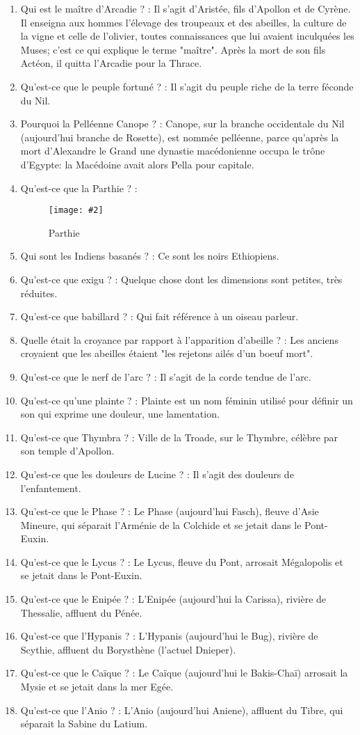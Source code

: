 \documentclass[a4paper, 11pt, hidelinks]{article}
\newcommand{\img}[4]{\begin{figure}[!ht]
    \centering
    \texttt{[image: \#2]}
    \caption{#3}
    \label{#4}
    \end{figure} }
\begin{document}
\begin{enumerate}
      \item Qui est le maître d'Arcadie ? : Il s'agit d'Aristée, fils d'Apollon et de Cyrène. Il enseigna aux hommes l'élevage des troupeaux et des abeilles, la culture de la vigne et celle de l'olivier,
            toutes connaissances que lui avaient inculquées les Muses; c'est ce qui explique le terme "maître". Après la mort de son fils Actéon, il quitta l'Arcadie pour la Thrace.
      \item Qu'est-ce que le peuple fortuné ? : Il s'agit du peuple riche de la terre féconde du Nil.
      \item Pourquoi la Pelléenne Canope ? : Canope, sur la branche occidentale du Nil (aujourd'hui branche de Rosette), est nommée pelléenne, parce qu'après la mort d'Alexandre le Grand une dynastie macédonienne 
            occupa le trône d'Egypte: la Macédoine avait alors Pella pour capitale.
      \item Qu'est-ce que la Parthie ? : 
            \img{0.1}{Parthie.png}{Parthie}{146}
      \item Qui sont les Indiens basanés ? : Ce sont les noirs Ethiopiens.
      \item Qu'est-ce que exigu ? : Quelque chose dont les dimensions sont petites, très réduites.
      \item Qu'est-ce que babillard ? : Qui fait référence à un oiseau parleur.
      \item Quelle était la croyance par rapport à l'apparition d'abeille ? : Les anciens croyaient que les abeilles étaient "les rejetons ailés d'un boeuf mort".
      \item Qu'est-ce que le nerf de l'arc ? : Il s'agit de la corde tendue de l'arc.
      \item Qu'est-ce qu'une plainte ? : Plainte est un nom féminin utilisé pour définir un son qui exprime une douleur, une lamentation.
      \item Qu'est-ce que Thymbra ? : Ville de la Troade, sur le Thymbre, célèbre par son temple d'Apollon.
      \item Qu'est-ce que les douleurs de Lucine ? : Il s'agit des douleurs de l'enfantement.
      \item Qu'est-ce que le Phase ? : Le Phase (aujourd'hui Fasch), fleuve d'Asie Mineure, qui séparait l'Arménie de la Colchide et se jetait dans le Pont-Euxin.
      \item Qu'est-ce que le Lycus ? : Le Lycus, fleuve du Pont, arrosait Mégalopolis et se jetait dans le Pont-Euxin.
      \item Qu'est-ce que le Enipée ? : L'Enipée (aujourd'hui la Carissa), rivière de Thessalie, affluent du Pénée.
      \item Qu'est-ce que l'Hypanis ? : L'Hypanis (aujourd'hui le Bug), rivière de Scythie, affluent du Borysthène (l'actuel Dnieper).
      \item Qu'est-ce que le Caïque ? : Le Caïque (aujourd'hui le Bakis-Chaï) arrosait la Mysie et se jetait dans la mer Egée.
      \item Qu'est-ce que l'Anio ? : L'Anio (aujourd'hui Aniene), affluent du Tibre, qui séparait la Sabine du Latium.
\end{enumerate}
\end{document}
